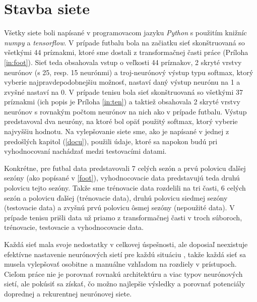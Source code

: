 \chapter{Stavba siete} \label{stavba}

Všetky siete boli napísané v programovacom jazyku \textit{Python} s použitím knižníc \textit{numpy} a \textit{tensorflow}.
V prípade futbalu bola na začiatku sieť skonštruovaná so všetkými 44 príznakmi, ktoré sme dostali z transformačnej časti práce (Príloha \ref{in:foot}).
Sieť teda obsahovala vstup o veľkosti 44 príznakov, 2 skryté vrstvy neurónov (s 25, resp. 15 neurónmi) a troj-neurónový výstup typu softmax, ktorý vyberie najpravdepodobnejšiu možnosť, nastaví daný výstup neurónu na 1 a zvyšné nastaví na 0.
V prípade tenisu bola sieť skonštruovaná so všetkými 37 príznakmi (ich popis je Príloha \ref{in:ten}) a taktiež obsahovala 2 skryté vrstvy neurónov s rovnakým počtom neurónov na nich ako v prípade futbalu. Výstup predstavoval dva neuróny, na ktoré bol opäť použitý softmax, ktorý vyberie najvyššiu hodnotu.
Na vylepšovanie siete sme, ako je napísané v jednej z predošlých kapitol (\ref{docu}), použili údaje, ktoré sa napokon budú pri vyhodnocovaní nachádzať medzi testovacími datami. 

Konkrétne, pre futbal data predstavovali 7 celých sezón a prvú polovicu ďalšej sezóny (ako popísané v \ref{foot}), vyhodnocovacie data predstavujú teda druhú polovicu tejto sezóny. 
Takže sme trénovacie data rozdelili na tri časti, 6 celých sezón a polovicu ďalšej (trénovacie data), druhú polovicu siedmej sezóny (testovacie data) a zvyšnú prvú polovicu ôsmej sezóny (nepoužité data).
V prípade tenisu prišli data už priamo z transformačnej časti v troch súboroch, trénovacie, testovacie a vyhodnocovacie data.

Každá sieť mala svoje nedostatky v celkovej úspešnosti, ale doposiaľ neexistuje efektívne nastavenie neurónových sietí pre každú situáciu \citep{gitgud}, takže každá sieť sa musela vylepšovať osobitne a manuálne vzhľadom na rozdiely v prístupoch.
Cieľom práce nie je porovnať rovnakú architektúru a viac typov neurónových sietí, ale pokúsiť sa získať, čo možno najlepšie výsledky a porovnať potenciály doprednej a rekurentnej neurónovej siete.

